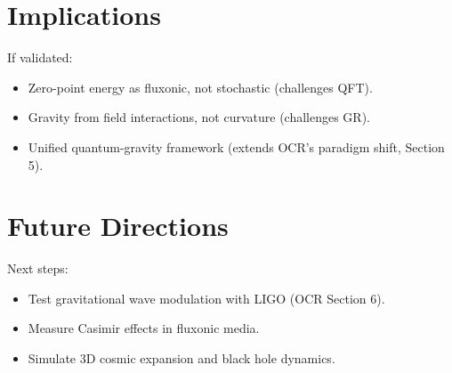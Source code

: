 \documentclass{article}
\begin{document}
\section{Implications}
If validated:
\begin{itemize}
    \item Zero-point energy as fluxonic, not stochastic (challenges QFT).
    \item Gravity from field interactions, not curvature (challenges GR).
    \item Unified quantum-gravity framework (extends OCR’s paradigm shift, Section 5).
\end{itemize}

\section{Future Directions}
Next steps:
\begin{itemize}
    \item Test gravitational wave modulation with LIGO (OCR Section 6).
    \item Measure Casimir effects in fluxonic media.
    \item Simulate 3D cosmic expansion and black hole dynamics.
\end{itemize}
\end{document}
